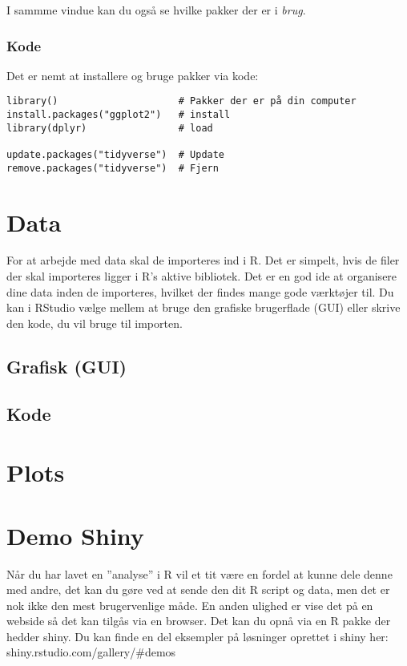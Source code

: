 \documentclass[
]{book}
\begin{document}
I sammme vindue kan du også se hvilke pakker der er i \emph{brug}.

\hypertarget{kode}{%
\subsection{Kode}\label{kode}}

Det er nemt at installere og bruge pakker via kode:

\begin{verbatim}
library()                     # Pakker der er på din computer
install.packages("ggplot2")   # install
library(dplyr)                # load

update.packages("tidyverse")  # Update
remove.packages("tidyverse")  # Fjern
\end{verbatim}

\hypertarget{data}{%
\chapter{Data}\label{data}}

For at arbejde med data skal de importeres ind i R. Det er simpelt, hvis de filer der skal importeres ligger i R's aktive bibliotek. Det er en god ide at organisere dine data inden de importeres, hvilket der findes mange gode værktøjer til.
Du kan i RStudio vælge mellem at bruge den grafiske brugerflade (GUI) eller skrive den kode, du vil bruge til importen.

\hypertarget{grafisk-gui}{%
\section{Grafisk (GUI)}\label{grafisk-gui}}

\hypertarget{kode-1}{%
\section{Kode}\label{kode-1}}

\hypertarget{plots}{%
\chapter{Plots}\label{plots}}

\hypertarget{shiny}{%
\chapter{Demo Shiny}\label{shiny}}

Når du har lavet en ''analyse'' i R vil et tit være en fordel at kunne dele denne med andre, det kan du gøre ved at sende den dit R script og data, men det er nok ikke den mest brugervenlige måde.
En anden ulighed er vise det på en webside så det kan tilgås via en browser. Det kan du opnå via en R pakke der hedder shiny.
Du kan finde en del eksempler på løsninger oprettet i shiny her: shiny.rstudio.com/gallery/\#demos
\end{document}
